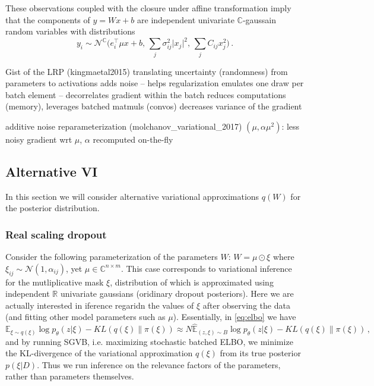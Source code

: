 \documentclass[a4paper,10pt]{article}
\newcommand{\real}{\mathbb{R}}
\newcommand{\cplx}{\mathbb{C}}
\begin{document}
These observations coupled with the closure under affine transformation imply
that the components of $y = W x + b$ are independent univariate $\cplx$-gaussain
random variables with distributions
$$
y_i
  \sim \mathcal{N}^{\cplx}
    \bigl(
      e_i^\top \mu x + b,
      \, \sum_j \sigma^2_{ij} \lvert x_j \rvert^2,
      \, \sum_j C_{ij} x_j^2
    \bigr)
  \,. $$

Gist of the LRP (kingmaetal2015)
translating uncertainty (randomness) from parameters to activations
  adds noise -- helps regularization
  emulates one draw per batch element -- decorrelates gradient within the batch
  reduces computations (memory), leverages batched matmuls (convos)
  decreases variance of the gradient

additive noise reparameterization (molchanov\_variational\_2017) $(\mu, \alpha \mu^2)$:
  less noisy gradient wrt $\mu$, $\alpha$ recomputed on-the-fly


\subsection{Alternative VI} %
\label{sub:alternative_vi}

In this section we will consider alternative variational approximations $q(W)$ for
the posterior distribution.

\subsubsection{Real scaling dropout} %
\label{ssub:real_scaling_dropout}

Consider the following parameterization of the parameters $W$: $
  W = \mu \odot \xi
$ where $
  \xi_{ij} \sim \mathcal{N}(1, \alpha_{ij})
$, yet $\mu \in \cplx^{n \times m}$. This case corresponds to variational inference for
the mutliplicative mask $\xi$, distribution of which is approximated using independent
$\real$ univariate gaussians (oridinary dropout posteriors). Here we are actually
interested in iference regaridn the values of $\xi$ after observing the data (and
fitting other model parameters such as $\mu$). Essentially, in \eqref{eq:elbo}
we have
$$
\mathbb{E}_{\xi \sim q(\xi)}
  \log p_\theta(z \vert \xi)
  - KL(q(\xi) \| \pi(\xi))
  \approx
    N \hat{\mathbb{E}}_{(z, \xi) \sim B}
      \log p_\theta(z \vert \xi)
    - KL(q(\xi) \| \pi(\xi))
  \,, $$
and by running SGVB, i.e. maximizing stochastic batched ELBO, we minimize the KL-divergence
of the variational approximation $q(\xi)$ from its true posterior $p(\xi\vert D)$. Thus
we run inference on the relevance factors of the parameters, rather than parameters
themselves.
\end{document}

